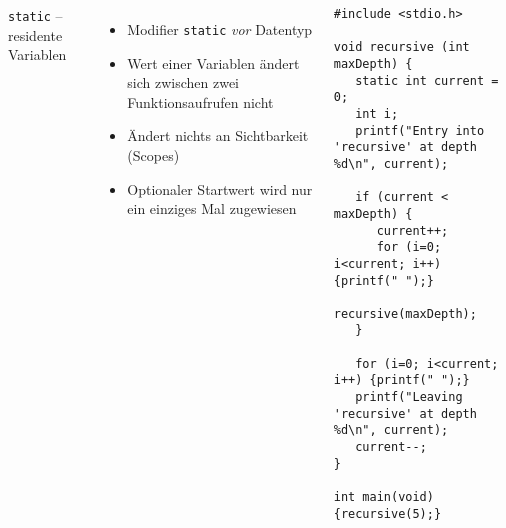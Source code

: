 

\begin{frame}[t,fragile]%
%
\begin{columns}[T]
\begin{Large}
\texttt{static} -- residente Variablen
\vspace{10pt}
\end{Large}
\begin{itemize}
\item Modifier \texttt{static} \emph{vor} Datentyp
\item Wert einer Variablen ändert sich zwischen zwei Funktionsaufrufen nicht
\item Ändert nichts an Sichtbarkeit (Scopes)
\item Optionaler Startwert wird nur ein einziges Mal zugewiesen
\end{itemize}
%
\begin{codebox}[Beispiel]
\begin{verbatim}
#include <stdio.h>

void recursive (int maxDepth) {
   static int current = 0;
   int i;
   printf("Entry into 'recursive' at depth %d\n", current);

   if (current < maxDepth) {
      current++;
      for (i=0; i<current; i++) {printf(" ");}
      recursive(maxDepth);
   }

   for (i=0; i<current; i++) {printf(" ");}
   printf("Leaving 'recursive' at depth %d\n", current);
   current--;
}

int main(void) {recursive(5);}
\end{verbatim}
\end{codebox}
\end{columns}

%
\end{frame}


